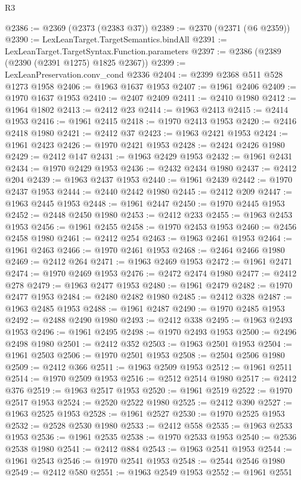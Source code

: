 \begin{lexlean}{R3}
\begin{coremodule}
@2386 := @2369 (@2373 (@2383 @37))
@2389 := @2370 (@2371 (@6 @2359))
@2390 := LexLeanTarget.TargetSemantics.bindAll
@2391 := LexLeanTarget.TargetSyntax.Function.parameters
@2397 := @2386 (@2389 (@2390 (@2391 @1275) @1825 @2367))
@2399 := LexLeanPreservation.conv_cond @2336
@2404 := @2399 @2368 @511 @528 @1273 @1958
@2406 := @1963 @1637 @1953
@2407 := @1961 @2406
@2409 := @1970 @1637 @1953
@2410 := @2407 @2409
@2411 := @2410 @1980
@2412 := @1964 @1802
@2413 := @2412 @23
@2414 := @1963 @2413
@2415 := @2414 @1953
@2416 := @1961 @2415
@2418 := @1970 @2413 @1953
@2420 := @2416 @2418 @1980
@2421 := @2412 @37
@2423 := @1963 @2421 @1953
@2424 := @1961 @2423
@2426 := @1970 @2421 @1953
@2428 := @2424 @2426 @1980
@2429 := @2412 @147
@2431 := @1963 @2429 @1953
@2432 := @1961 @2431
@2434 := @1970 @2429 @1953
@2436 := @2432 @2434 @1980
@2437 := @2412 @204
@2439 := @1963 @2437 @1953
@2440 := @1961 @2439
@2442 := @1970 @2437 @1953
@2444 := @2440 @2442 @1980
@2445 := @2412 @209
@2447 := @1963 @2445 @1953
@2448 := @1961 @2447
@2450 := @1970 @2445 @1953
@2452 := @2448 @2450 @1980
@2453 := @2412 @233
@2455 := @1963 @2453 @1953
@2456 := @1961 @2455
@2458 := @1970 @2453 @1953
@2460 := @2456 @2458 @1980
@2461 := @2412 @254
@2463 := @1963 @2461 @1953
@2464 := @1961 @2463
@2466 := @1970 @2461 @1953
@2468 := @2464 @2466 @1980
@2469 := @2412 @264
@2471 := @1963 @2469 @1953
@2472 := @1961 @2471
@2474 := @1970 @2469 @1953
@2476 := @2472 @2474 @1980
@2477 := @2412 @278
@2479 := @1963 @2477 @1953
@2480 := @1961 @2479
@2482 := @1970 @2477 @1953
@2484 := @2480 @2482 @1980
@2485 := @2412 @328
@2487 := @1963 @2485 @1953
@2488 := @1961 @2487
@2490 := @1970 @2485 @1953
@2492 := @2488 @2490 @1980
@2493 := @2412 @338
@2495 := @1963 @2493 @1953
@2496 := @1961 @2495
@2498 := @1970 @2493 @1953
@2500 := @2496 @2498 @1980
@2501 := @2412 @352
@2503 := @1963 @2501 @1953
@2504 := @1961 @2503
@2506 := @1970 @2501 @1953
@2508 := @2504 @2506 @1980
@2509 := @2412 @366
@2511 := @1963 @2509 @1953
@2512 := @1961 @2511
@2514 := @1970 @2509 @1953
@2516 := @2512 @2514 @1980
@2517 := @2412 @376
@2519 := @1963 @2517 @1953
@2520 := @1961 @2519
@2522 := @1970 @2517 @1953
@2524 := @2520 @2522 @1980
@2525 := @2412 @390
@2527 := @1963 @2525 @1953
@2528 := @1961 @2527
@2530 := @1970 @2525 @1953
@2532 := @2528 @2530 @1980
@2533 := @2412 @558
@2535 := @1963 @2533 @1953
@2536 := @1961 @2535
@2538 := @1970 @2533 @1953
@2540 := @2536 @2538 @1980
@2541 := @2412 @884
@2543 := @1963 @2541 @1953
@2544 := @1961 @2543
@2546 := @1970 @2541 @1953
@2548 := @2544 @2546 @1980
@2549 := @2412 @580
@2551 := @1963 @2549 @1953
@2552 := @1961 @2551

\end{coremodule}
\end{lexlean}
